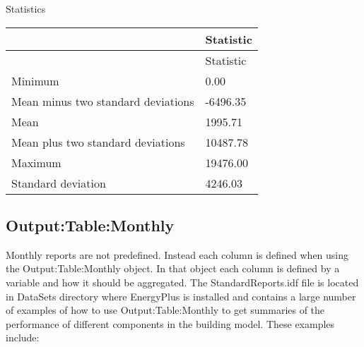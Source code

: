 Statistics

\begin{longtable}[c]{@{}ll@{}}
\toprule 
~ & Statistic \tabularnewline
\midrule
\endfirsthead

\toprule 
~ & Statistic \tabularnewline
\midrule
\endhead

Minimum & 0.00 \tabularnewline
Mean minus two standard deviations & -6496.35 \tabularnewline
Mean & 1995.71 \tabularnewline
Mean plus two standard deviations & 10487.78 \tabularnewline
Maximum & 19476.00 \tabularnewline
Standard deviation & 4246.03 \tabularnewline
\bottomrule
\end{longtable}

\subsection{Output:Table:Monthly}\label{outputtablemonthly}

Monthly reports are not predefined. Instead each column is defined when using the Output:Table:Monthly object. In that object each column is defined by a variable and how it should be aggregated. The StandardReports.idf file is located in DataSets directory where EnergyPlus is installed and contains a large number of examples of how to use Output:Table:Monthly to get summaries of the performance of different components in the building model. These examples include:

